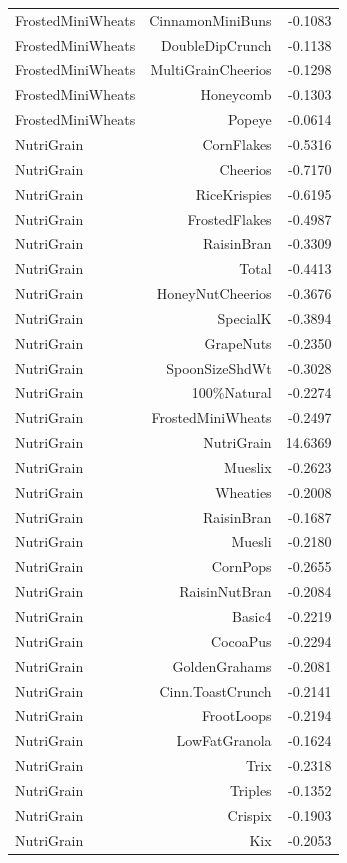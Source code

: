\begin{longtable}{@{}lrr@{}}
FrostedMiniWheats & CinnamonMiniBuns & -0.1083 \\
FrostedMiniWheats & DoubleDipCrunch & -0.1138 \\
FrostedMiniWheats & MultiGrainCheerios & -0.1298 \\
FrostedMiniWheats & Honeycomb & -0.1303 \\
FrostedMiniWheats & Popeye & -0.0614 \\
NutriGrain & CornFlakes & -0.5316 \\
NutriGrain & Cheerios & -0.7170 \\
NutriGrain & RiceKrispies & -0.6195 \\
NutriGrain & FrostedFlakes & -0.4987 \\
NutriGrain & RaisinBran & -0.3309 \\
NutriGrain & Total & -0.4413 \\
NutriGrain & HoneyNutCheerios & -0.3676 \\
NutriGrain & SpecialK & -0.3894 \\
NutriGrain & GrapeNuts & -0.2350 \\
NutriGrain & SpoonSizeShdWt & -0.3028 \\
NutriGrain & 100\%Natural & -0.2274 \\
NutriGrain & FrostedMiniWheats & -0.2497 \\
NutriGrain & NutriGrain & 14.6369 \\
NutriGrain & Mueslix & -0.2623 \\
NutriGrain & Wheaties & -0.2008 \\
NutriGrain & RaisinBran & -0.1687 \\
NutriGrain & Muesli & -0.2180 \\
NutriGrain & CornPops & -0.2655 \\
NutriGrain & RaisinNutBran & -0.2084 \\
NutriGrain & Basic4 & -0.2219 \\
NutriGrain & CocoaPus & -0.2294 \\
NutriGrain & GoldenGrahams & -0.2081 \\
NutriGrain & Cinn.ToastCrunch & -0.2141 \\
NutriGrain & FrootLoops & -0.2194 \\
NutriGrain & LowFatGranola & -0.1624 \\
NutriGrain & Trix & -0.2318 \\
NutriGrain & Triples & -0.1352 \\
NutriGrain & Crispix & -0.1903 \\
NutriGrain & Kix & -0.2053 \\

\end{longtable}
